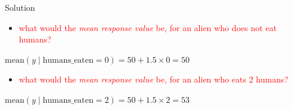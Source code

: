 \documentclass[
  10pt,
  ignorenonframetext,
  aspectratio=169,
  t]{beamer}
\providecommand{\tightlist}{%
  \setlength{\itemsep}{0pt}\setlength{\parskip}{0pt}}
\newcommand{\blueit}[1]{\textcolor{bluebeamer}{\emph{#1}}}
\begin{document}
\begin{frame}{Solution}
\protect{}\label{solution}
\vfill

\begin{itemize}
\tightlist
\item
  \textcolor{red}{what would the \blueit{mean response value} be, for an alien who does not eat humans?}
\end{itemize}

\begin{center}
$\text{mean}(y \mid \text{humans\_eaten}=0) = 50 + 1.5 \times 0 = 50$
\end{center}

\pause

\vspace{1cm}

\begin{itemize}
\tightlist
\item
  \textcolor{red}{what would the \blueit{mean response value} be, for an alien who eats 2 humans?}
\end{itemize}

\begin{center}
$\text{mean}(y \mid \text{humans\_eaten}=2) = 50 + 1.5 \times 2 = 53$
\end{center}

\vfill
\end{frame}
\end{document}
